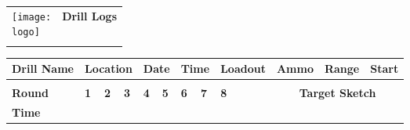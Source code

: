 \documentclass[../Cover.tex]{subfiles}
\begin{document}
\begin{minipage}[t][0.15\textheight][t]{\textwidth}
	\begin{tabular}{p{} p{}}
	\texttt{[image: \\logo]}} & \textbf{Drill Logs} \\
	&\\[.5cm]
	\end{tabular}
\end{minipage}
\begin{minipage}[t][0.85\textheight][t]{\textwidth}
	\begin{tabular}{|l|l|l|l|l|l|l|l|l|l|l|l|l|l|l|l|l|l|l|l|}
		\hline
		\multicolumn{3}{|l|}{\cellcolor[HTML]{C0C0C0}\textbf{Drill Name}} & \multicolumn{3}{l|}{\cellcolor[HTML]{C0C0C0}\textbf{Location}}                                               & \multicolumn{2}{l|}{\cellcolor[HTML]{C0C0C0}\textbf{Date}}              & \multicolumn{2}{l|}{\cellcolor[HTML]{C0C0C0}\textbf{Time}}              & \multicolumn{3}{l|}{\cellcolor[HTML]{C0C0C0}\textbf{Loadout}} & \multicolumn{3}{l|}{\cellcolor[HTML]{C0C0C0}\textbf{Ammo}} & \multicolumn{2}{l|}{\cellcolor[HTML]{C0C0C0}\textbf{Range}} & \multicolumn{2}{l|}{\cellcolor[HTML]{C0C0C0}\textbf{Start}} \\ \hline
		\multicolumn{3}{|l|}{}                                            & \multicolumn{3}{l|}{}                                                                                        & \multicolumn{2}{l|}{}                                                   & \multicolumn{2}{l|}{}                                                   & \multicolumn{3}{l|}{}                                         & \multicolumn{3}{l|}{}                                      & \multicolumn{2}{l|}{}                                       & \multicolumn{2}{l|}{}                                       \\ \hline
		\multicolumn{3}{|l|}{\cellcolor[HTML]{C0C0C0}\textbf{Round}}      & \cellcolor[HTML]{C0C0C0}\textbf{1} & \cellcolor[HTML]{C0C0C0}\textbf{2} & \cellcolor[HTML]{C0C0C0}\textbf{3} & \cellcolor[HTML]{C0C0C0}\textbf{4} & \cellcolor[HTML]{C0C0C0}\textbf{5} & \cellcolor[HTML]{C0C0C0}\textbf{6} & \cellcolor[HTML]{C0C0C0}\textbf{7} & \cellcolor[HTML]{C0C0C0}\textbf{8}        &         & \multicolumn{8}{c|}{\cellcolor[HTML]{C0C0C0}\textbf{Target Sketch}}                                                                                                                              \\ \cline{1-11} \cline{13-20} 
		\multicolumn{3}{|l|}{\textbf{Time}}                               &                                    &                                    &                                    &                                    &                                    &                                    &                                    &                                           &         & \multicolumn{8}{l|}{}                                                                                                                                                                            \\ \cline{1-11}

\end{tabular}
\end{minipage}
\end{document}
